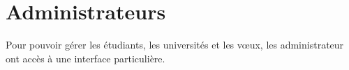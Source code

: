 \chapter{Administrateurs}
\label{chap::admins}
Pour pouvoir gérer les étudiants, les universités et les vœux, les administrateur ont accès à une interface particulière.